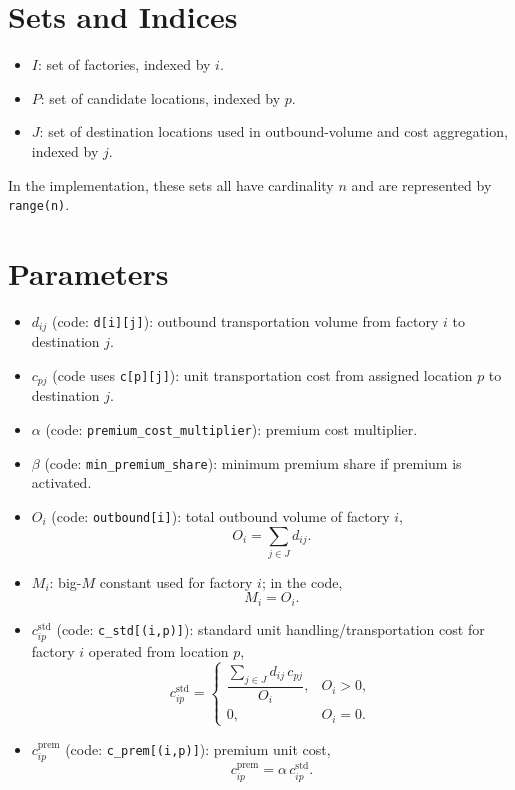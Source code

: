 \section*{Sets and Indices}

\begin{itemize}
    \item $I$: set of factories, indexed by $i$.
    \item $P$: set of candidate locations, indexed by $p$.
    \item $J$: set of destination locations used in outbound-volume and cost aggregation, indexed by $j$.
\end{itemize}

In the implementation, these sets all have cardinality $n$ and are represented by \texttt{range(n)}.

\section*{Parameters}

\begin{itemize}
    \item $d_{ij}$ (code: \texttt{d[i][j]}): outbound transportation volume from factory $i$ to destination $j$.
    \item $c_{pj}$ (code uses \texttt{c[p][j]}): unit transportation cost from assigned location $p$ to destination $j$.
    \item $\alpha$ (code: \texttt{premium\_cost\_multiplier}): premium cost multiplier.
    \item $\beta$ (code: \texttt{min\_premium\_share}): minimum premium share if premium is activated.
    \item $O_i$ (code: \texttt{outbound[i]}): total outbound volume of factory $i$,
    \[
    O_i = \sum_{j \in J} d_{ij}.
    \]
    \item $M_i$: big-$M$ constant used for factory $i$; in the code,
    \[
    M_i = O_i.
    \]
    \item $c^{\mathrm{std}}_{ip}$ (code: \texttt{c\_std[(i,p)]}): standard unit handling/transportation cost for factory $i$ operated from location $p$,
    \[
    c^{\mathrm{std}}_{ip} =
    \begin{cases}
    \dfrac{\sum_{j \in J} d_{ij}\, c_{pj}}{O_i}, & O_i > 0,\\[6pt]
    0, & O_i = 0.
    \end{cases}
    \]
    \item $c^{\mathrm{prem}}_{ip}$ (code: \texttt{c\_prem[(i,p)]}): premium unit cost,
    \[
    c^{\mathrm{prem}}_{ip} = \alpha\, c^{\mathrm{std}}_{ip}.
    \]
\end{itemize}

